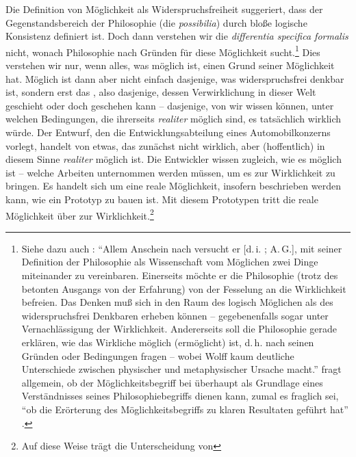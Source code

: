 \begin{nummerierung}
Die Definition von Möglichkeit als Widerspruchsfreiheit
suggeriert, dass der Gegenstandsbereich der Philosophie (die \emph{possibilia})
durch bloße logische Konsistenz definiert ist. Doch dann verstehen wir die
\emph{differentia specifica formalis} nicht, wonach Philosophie nach Gründen für
diese Möglichkeit sucht.\footnote{Siehe dazu auch
\cite[][23]{Schneiders:Deusestphilosophusabsolutesummus1986}: \enquote{Allem Anschein nach versucht er [d.\,i.
; A.\,G.], mit
seiner Definition der Philosophie als Wissenschaft vom Möglichen zwei Dinge
miteinander zu vereinbaren. Einerseits möchte er die Philosophie (trotz des
betonten Ausgangs von der Erfahrung) von der Fesselung an die Wirklichkeit
befreien. Das Denken muß sich in den Raum des logisch Möglichen
als des widerspruchsfrei Denkbaren erheben können -- gegebenenfalls sogar unter
Vernachlässigung der Wirklichkeit. Andererseits soll die Philosophie gerade
erklären, wie das Wirkliche möglich (ermöglicht) ist, d.\,h. nach seinen Gründen
oder Bedingungen fragen -- wobei Wolff kaum deutliche Unterschiede zwischen
physischer und metaphysischer Ursache macht.}
 fragt allgemein,
ob der Möglichkeitsbegriff bei 
überhaupt als Grundlage eines Verständnisses seines Philosophiebegriffs dienen
kann, zumal es fraglich sei, \enquote{ob die Erörterung des
Möglichkeitsbegriffs zu klaren Resultaten geführt hat}
\parencite[][9]{Schneiders:Deusestphilosophusabsolutesummus1986}.} Dies
verstehen wir nur, wenn alles, was möglich ist, einen Grund seiner Möglichkeit
hat. Möglich ist dann aber nicht einfach dasjenige, was widerspruchsfrei denkbar
ist, sondern erst das , also dasjenige, dessen
Verwirklichung in dieser Welt geschieht oder doch geschehen kann -- dasjenige,
von wir wissen können, unter welchen Bedingungen, die ihrerseits
\emph{realiter} möglich sind, es tatsächlich wirklich würde. Der Entwurf, den
die Ent\-wick\-lungs\-ab\-tei\-lung eines Automobilkonzerns vorlegt, handelt von
etwas, das zunächst nicht wirklich, aber (hoffentlich) in diesem Sinne
\emph{realiter} möglich ist. Die Entwickler wissen zugleich, wie es möglich ist -- welche Arbeiten
unternommen werden müssen, um es zur Wirklichkeit zu bringen. Es handelt sich um
eine reale Möglichkeit, insofern beschrieben werden kann, wie ein Prototyp zu
bauen ist. Mit diesem Prototypen tritt die reale Möglichkeit über zur
Wirklichkeit.\footnote{Auf diese Weise trägt
 die Unterscheidung von
}
\end{nummerierung}

